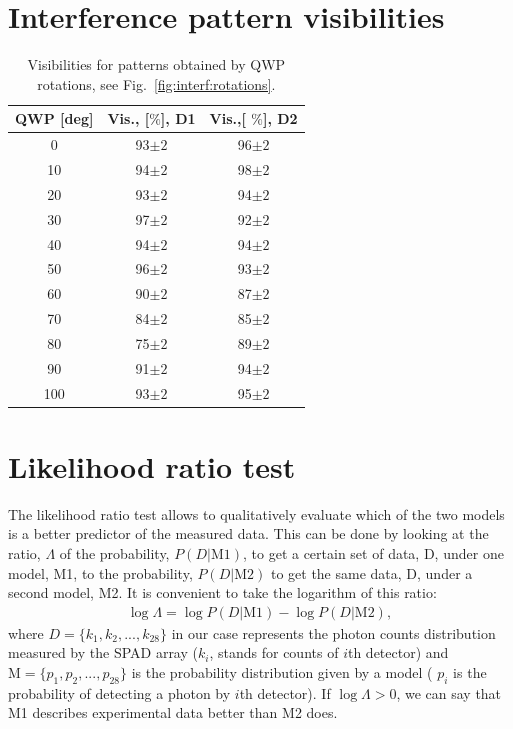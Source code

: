 \documentclass[prl,reprint,twocolumn,amsmath,preprintnumbers,amssymb,superscriptaddress]{revtex4-1}
\newcommand{\figref}[1]{Fig.~\ref{#1}}
\begin{document}
\section{Interference pattern visibilities}
\begin{table}[h]
\begin{tabular}{c  c  c }
QWP [deg] & Vis., [$\%$], D1& Vis.,[ $\%$], D2\\
\hline \hline
0 & 93$\pm2$ & 96$\pm2$\\ 
10 & 94$\pm2$ & 98$\pm2$  \\ 
20 & 93$\pm2$ & 94$\pm2$ \\ 
30 & 97$\pm2$ & 92$\pm2$ \\ 
40 & 94$\pm2$ &94$\pm2$ \\ 
50 & 96$\pm2$& 93$\pm2$ \\ 
60 & 90$\pm2$ &87$\pm2$ \\ 
70 & 84$\pm2$  &85$\pm2$ \\ 
80 & 75$\pm2$  &89$\pm2$ \\ 
90 & 91$\pm2$  &94$\pm2$\\ 
100 & 93$\pm2$ &95$\pm2$ \\ 
\end{tabular}
\caption{Visibilities for patterns obtained by QWP rotations, see \figref{fig:interf:rotations}.}
\label{TableVis}
\end{table}


\section{Likelihood ratio test}

The likelihood ratio test \cite{Casella2001} allows to qualitatively evaluate which of the two models is a better predictor of the measured data. This can be done by looking at the ratio, $\Lambda$ of the probability, $P(D|\text{M1})$, to get a certain set of data, D, under one model, M1, to the probability, $P(D|\text{M2})$ to get the same data, D, under a second model, M2.  It is convenient to take the logarithm of this ratio:
\begin{eqnarray}
\log \Lambda=\log P(D|\text{M1})-\log P(D|\text{M2}),
\end{eqnarray}
where $D=\{k_1, k_2, ..., k_{28}\}$ in our case represents the photon counts distribution measured by the SPAD array ($k_i$, stands for counts of $i$th detector) and $\text{M}=\{p_1, p_2,...,p_{28}\}$ is the probability distribution given by a model ( $p_i$ is the probability of detecting a photon by $i$th detector). If $\log \Lambda>0$, we can say that M1 describes experimental data better than M2 does.
\end{document}
